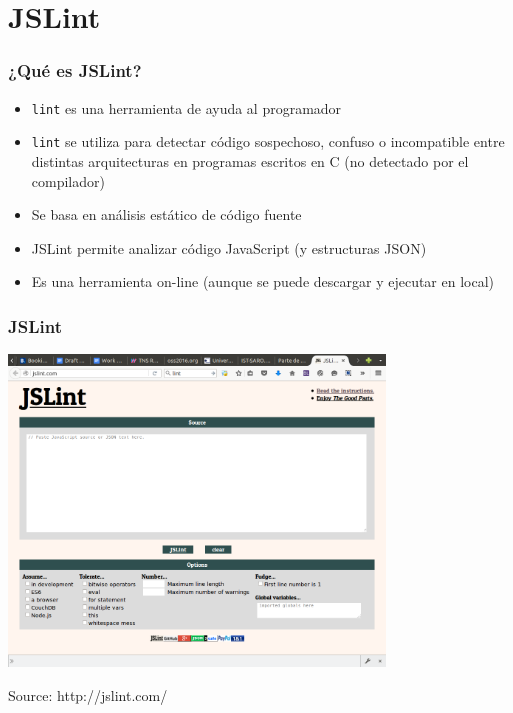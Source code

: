 \section{JSLint}


\begin{frame}
\frametitle{¿Qué es JSLint?}

\begin{itemize}
   \item \texttt{lint} es una herramienta de ayuda al programador
   \item \texttt{lint} se utiliza para detectar código sospechoso, confuso o incompatible entre distintas arquitecturas en programas escritos en C (no detectado por el compilador)
   \item Se basa en análisis estático de código fuente
   \item JSLint permite analizar código JavaScript (y estructuras JSON)
   \item Es una herramienta on-line (aunque se puede descargar y ejecutar en local)
\end{itemize}

\end{frame}



\begin{frame}
\frametitle{JSLint}

\begin{center}
  \includegraphics[width=10cm]{figs/jslint.png}
\end{center}


\begin{flushright}
{\tiny
Source: http://jslint.com/
}
\end{flushright}

\end{frame}

